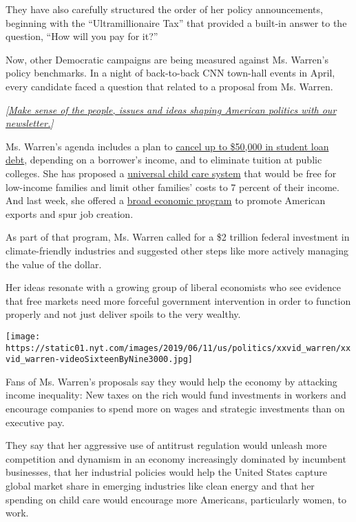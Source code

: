They have also carefully structured the order of her policy
announcements, beginning with the ``Ultramillionaire Tax'' that provided
a built-in answer to the question, ``How will you pay for it?''

Now, other Democratic campaigns are being measured against Ms. Warren's
policy benchmarks. In a night of back-to-back CNN town-hall events in
April, every candidate faced a question that related to a proposal from
Ms. Warren.

\emph{{[}}\href{https://www.nytimes.com/newsletters/politics?smid=rd?action=click\&module=Intentional\&pgtype=Article}{\emph{Make
sense of the people, issues and ideas shaping American politics with our
newsletter.}}\emph{{]}}

Ms. Warren's agenda includes a plan to
\href{https://www.nytimes.com/2019/04/22/us/politics/elizabeth-warren-student-debt.html}{cancel
up to \$50,000 in student loan debt}, depending on a borrower's income,
and to eliminate tuition at public colleges. She has proposed a
\href{https://www.nytimes.com/2019/02/19/us/politics/elizabeth-warren-child-care.html}{universal
child care system} that would be free for low-income families and limit
other families' costs to 7 percent of their income. And last week, she
offered a
\href{https://www.nytimes.com/2019/06/04/us/politics/elizabeth-warren-economy-jobs.html}{broad
economic program} to promote American exports and spur job creation.

As part of that program, Ms. Warren called for a \$2 trillion federal
investment in climate-friendly industries and suggested other steps like
more actively managing the value of the dollar.

Her ideas resonate with a growing group of liberal economists who see
evidence that free markets need more forceful government intervention in
order to function properly and not just deliver spoils to the very
wealthy.

\texttt{[image: https://static01.nyt.com/images/2019/06/11/us/politics/xxvid\_warren/xxvid\_warren-videoSixteenByNine3000.jpg]}

Fans of Ms. Warren's proposals say they would help the economy by
attacking income inequality: New taxes on the rich would fund
investments in workers and encourage companies to spend more on wages
and strategic investments than on executive pay.

They say that her aggressive use of antitrust regulation would unleash
more competition and dynamism in an economy increasingly dominated by
incumbent businesses, that her industrial policies would help the United
States capture global market share in emerging industries like clean
energy and that her spending on child care would encourage more
Americans, particularly women, to work.

